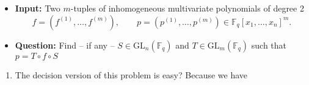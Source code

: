 \documentclass[12pt]{article}
\newcommand{\F}{\mathbb{F}}
\newcommand{\GL}{\text{GL}}
\begin{document}
\begin{center}
    \begin{itemize}
	\item \textbf{Input:} Two $m$-tuples of inhomogeneous multivariate polynomials of degree 2
	    \[
		f = (f^{(1)},\ldots, f^{(m)}), \qquad p = (p^{(1)}, \ldots, p^{(m)}) \in \F_q[x_1, \ldots, x_n]^m.
	    \]

	\item \textbf{Question:} Find -- if any -- $S \in \GL_n(\F_q)$ and $T \in \GL_m(\F_q)$ such that $p = T \circ f \circ S$
    \end{itemize}
\end{center}

\begin{enumerate}
    \item The decision version of this problem is easy? Because we have
\end{enumerate}
\end{document}
